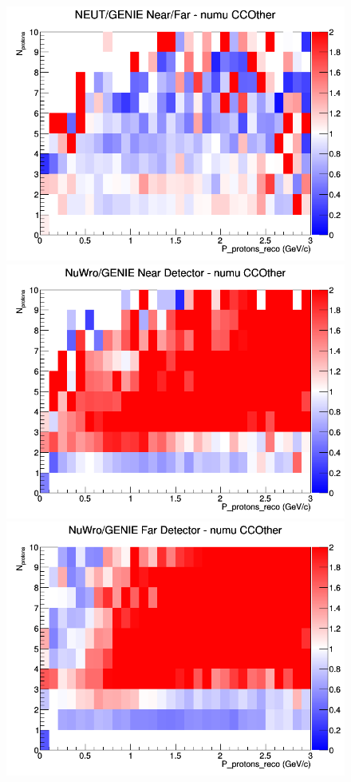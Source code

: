 \documentclass[12pt]{article}
\begin{document}
\begin{figure}[h]
\endminipage
{}
\includegraphics[width=\linewidth]{eff_N_P/FGT/protons/ratios/CCOther_NEUT_GENIE_numu_NF_N_P.png}
\endminipage
\newline
{}
\includegraphics[width=\linewidth]{eff_N_P/FGT/protons/ratios/CCOther_NuWro_GENIE_numu_near_N_P.png}
\endminipage
{}
\includegraphics[width=\linewidth]{eff_N_P/FGT/protons/ratios/CCOther_NuWro_GENIE_numu_far_N_P.png}

\end{figure}
\end{document}
